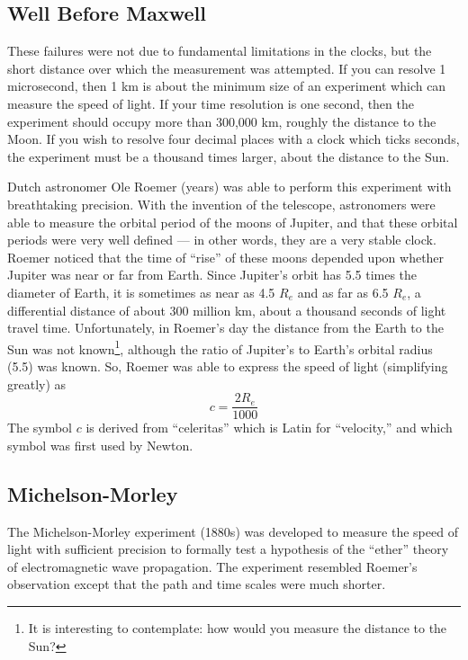 \subsection{Well Before Maxwell}

These failures were not due to fundamental limitations in the clocks,
but the short distance over which the measurement was attempted.  If
you can resolve 1 microsecond, then 1 km is about the minimum size of
an experiment which can measure the speed of light.  If your time
resolution is one second, then the experiment should occupy more than
300,000 km, roughly the distance to the Moon.  If you wish to resolve
four decimal places with a clock which ticks seconds, the experiment
must be a thousand times larger, about the distance to the Sun.

Dutch astronomer Ole Roemer (years) was able to perform this experiment
with breathtaking precision.  With the invention of the telescope,
astronomers were able to measure the orbital period of the moons of
Jupiter, and that these orbital periods were very well defined --- in
other words, they are a very stable clock.  Roemer noticed that the
time of ``rise'' of these moons depended upon whether Jupiter was near
or far from Earth.  Since Jupiter's orbit has 5.5 times the diameter
of Earth, it is sometimes as near as 4.5 $R_e$ and as far as 6.5
$R_e$, a differential distance of about 300 million km, about a thousand
seconds of light travel time.  Unfortunately, in Roemer's day the
distance from the Earth to the Sun was not known\footnote{It is interesting
to contemplate: how would you measure the distance to the Sun?}, although the ratio
of Jupiter's to Earth's orbital radius (5.5) was known.  So, Roemer
was able to express the speed of light (simplifying greatly) as 
\begin{displaymath}
c = \frac{2R_e}{1000}
\end{displaymath}
The symbol $c$ is derived from ``celeritas'' which is Latin for
``velocity,'' and which symbol was first used by Newton.

\subsection{Michelson-Morley}

The Michelson-Morley experiment (1880s) was developed to measure
the speed of light with sufficient precision to formally test a
hypothesis of the ``ether'' theory of electromagnetic wave
propagation.  The experiment resembled Roemer's observation except
that the path and time scales were much shorter.

